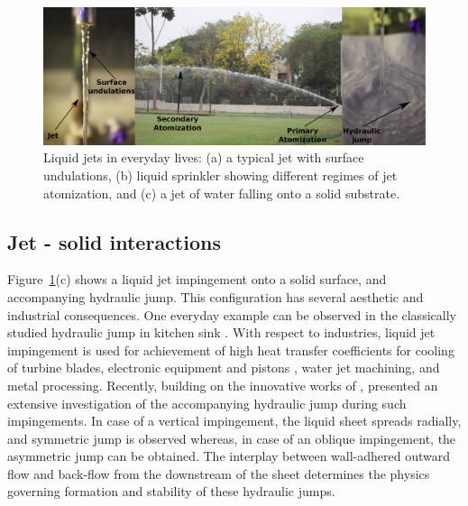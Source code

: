 \begin{figure}
\centering
\includegraphics[width=\textwidth]{chapters/introduction/examples}
\caption{Liquid jets in everyday lives: (a) a typical jet with surface undulations, (b) liquid sprinkler showing different regimes of jet atomization, and (c) a jet of water falling onto a solid substrate.}
\label{Figure::examples}
\end{figure}
\subsection{Jet - solid interactions}
Figure~\ref{Figure::examples}(c) shows a liquid jet impingement onto a solid surface, and accompanying hydraulic jump. This configuration has several aesthetic and industrial consequences. One everyday example can be observed in the classically studied hydraulic jump in kitchen sink \citep{eggers2008physics}. With respect to industries, liquid jet impingement is used for achievement of high heat transfer coefficients for cooling of turbine blades, electronic equipment and pistons \citep{bergles1983boiling,chen2018numerical}, water jet machining, and metal processing. Recently, building on the innovative works of \citet{kate2007hydraulic}, \citet{singh2018computational} presented an extensive investigation of the accompanying hydraulic jump during such impingements. In case of a vertical impingement, the liquid sheet spreads radially, and symmetric jump is observed whereas, in case of an oblique impingement, the asymmetric jump can be obtained. The interplay between wall-adhered outward flow and back-flow from the downstream of the sheet determines the physics governing formation and stability of these hydraulic jumps.   
